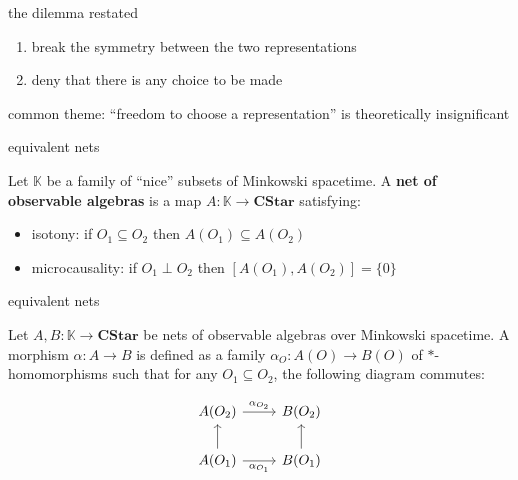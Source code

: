 \documentclass{beamer}
\begin{document}
\begin{frame}{the dilemma restated}

\begin{enumerate}
\item break the symmetry between the two representations
\item deny that there is any choice to be made
\end{enumerate}

\bigskip
common theme: ``freedom to choose a representation'' is
theoretically insignificant


\end{frame}



\begin{frame}{equivalent nets}

  Let $\mathbb{K}$ be a family of ``nice'' subsets of Minkowski
  spacetime.  A \textbf{net of observable algebras} is a map
  $A:\mathbb{K}\to \mathbf{CStar}$ satisfying:

\begin{itemize}
\item isotony: if $O_1\subseteq O_2$ then $A(O_1)\subseteq A(O_2)$
\item microcausality: if $O_1\perp O_2$ then $[A(O_1),A(O_2)]=\{ 0\}$
\end{itemize}

\end{frame}

\begin{frame}{equivalent nets}

  Let $A,B:\mathbb{K}\to \mathbf{CStar}$ be nets of observable
  algebras over Minkowski spacetime.  A morphism $\alpha :A\to B$ is
  defined as a family $\alpha _O:A(O)\to B(O)$ of $*$-homomorphisms
  such that for any $O_1\subseteq O_2$, the following diagram
  commutes:

$$
\begin{tikzcd}[ampersand replacement=\&]
  A(O_2) \arrow{r}{\alpha _{O_2}}    \& B(O_2) \\
  A(O_1) \arrow{u}[left]{ } \arrow{r}[below]{\alpha _{O_1}} \& B(O_1) \arrow{u}[right]{ } 
\end{tikzcd}
$$

\end{frame}
\end{document}
